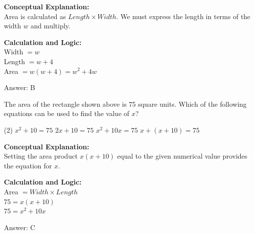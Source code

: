 \documentclass[11pt,paper=a4,answers]{exam}
\begin{document}
\begin{questions}
\begin{solution}
\textbf{Conceptual Explanation:} \\
Area is calculated as $Length \times Width$. We must express the length in terms of the width $w$ and multiply.

\vspace{20pt}

\textbf{Calculation and Logic:} \\
Width $= w$ \\
Length $= w + 4$ \\
Area $= w(w + 4) = w^2 + 4w$

\vspace{25pt}

Answer: \colorbox{yellow!100}{B}
\end{solution}

\vspace{40pt}

\question
\begin{center}
\end{center}
The area of the rectangle shown above is 75 square units. Which of the following equations can be used to find the value of $x$?
\begin{tasks}(2)
    \task $x^2 + 10 = 75$
    \task $2x + 10 = 75$
    \task $x^2 + 10x = 75$
    \task $x + (x+10) = 75$
\end{tasks}

\begin{solution}
\textbf{Conceptual Explanation:} \\
Setting the area product $x(x+10)$ equal to the given numerical value provides the equation for $x$.

\vspace{20pt}

\textbf{Calculation and Logic:} \\
Area $= Width \times Length$ \\
$75 = x(x+10)$ \\
$75 = x^2 + 10x$

\vspace{25pt}

Answer: \colorbox{yellow!100}{C}
\end{solution}


\end{questions}
\end{document}
